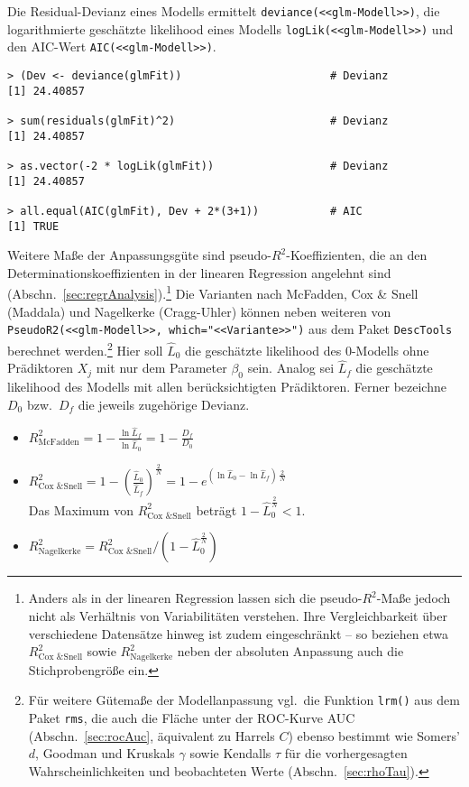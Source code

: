 Die Residual-Devianz eines Modells ermittelt \lstinline!deviance(<<glm-Modell>>)!, die logarithmierte geschätzte likelihood eines Modells \lstinline!logLik(<<glm-Modell>>)! und den AIC-Wert  \lstinline!AIC(<<glm-Modell>>)!.
\begin{lstlisting}
> (Dev <- deviance(glmFit))                       # Devianz
[1] 24.40857

> sum(residuals(glmFit)^2)                        # Devianz
[1] 24.40857

> as.vector(-2 * logLik(glmFit))                  # Devianz
[1] 24.40857

> all.equal(AIC(glmFit), Dev + 2*(3+1))           # AIC
[1] TRUE
\end{lstlisting}

Weitere Maße der Anpassungsgüte sind pseudo-$R^{2}$-Koeffizienten, die an den Determinationskoeffizienten in der linearen Regression angelehnt sind (Abschn.\ \ref{sec:regrAnalysis}).\footnote{Anders als in der linearen Regression lassen sich die pseudo-$R^{2}$-Maße jedoch nicht als Verhältnis von Variabilitäten verstehen. Ihre Vergleichbarkeit über verschiedene Datensätze hinweg ist zudem eingeschränkt -- so beziehen etwa $R^{2}_{\text{Cox \& Snell}}$ sowie $R^{2}_{\text{Nagelkerke}}$ neben der absoluten Anpassung auch die Stichprobengröße ein.} Die Varianten nach McFadden, Cox \& Snell (Maddala) und Nagelkerke (Cragg-Uhler) können neben weiteren von  \lstinline!PseudoR2(<<glm-Modell>>, which="<<Variante>>")! aus dem Paket \lstinline!DescTools! berechnet werden.\footnote{\label{ftn:rmsLrm}Für weitere Gütemaße der Modellanpassung vgl.\ die Funktion \lstinline!lrm()! aus dem Paket \lstinline!rms!, die auch die Fläche unter der ROC-Kurve AUC (Abschn.\ \ref{sec:rocAuc}, äquivalent zu Harrels $C$) ebenso bestimmt wie Somers' $d$, Goodman und Kruskals $\gamma$ sowie Kendalls $\tau$ für die vorhergesagten Wahrscheinlichkeiten und beobachteten Werte (Abschn.\ \ref{sec:rhoTau}).} Hier soll $\hat{L}_{0}$ die geschätzte likelihood des $0$-Modells ohne Prädiktoren $X_{j}$ mit nur dem Parameter $\beta_{0}$ sein. Analog sei $\hat{L}_{f}$ die geschätzte likelihood des Modells mit allen berücksichtigten Prädiktoren. Ferner bezeichne $D_{0}$ bzw.\ $D_{f}$ die jeweils zugehörige Devianz.
\begin{itemize}
\item $R^{2}_{\text{McFadden}} = 1 - \frac{\ln \hat{L}_{f}}{\ln \hat{L}_{0}} = 1 - \frac{D_{f}}{D_{0}}$
\item $R^{2}_{\text{Cox \& Snell}} = 1 - \left(\frac{\hat{L}_{0}}{\hat{L}_{f}}\right)^{\frac{2}{N}} = 1- e^{(\ln \hat{L}_{0} - \ln \hat{L}_{f}) \, \frac{2}{N}}$\\
      Das Maximum von $R^{2}_{\text{Cox \& Snell}}$ beträgt $1 - \hat{L}_{0}^{\frac{2}{N}} < 1$.
\item $R^{2}_{\text{Nagelkerke}} = R^{2}_{\text{Cox \& Snell}} / (1 - \hat{L}_{0}^{\frac{2}{N}})$
\end{itemize}


